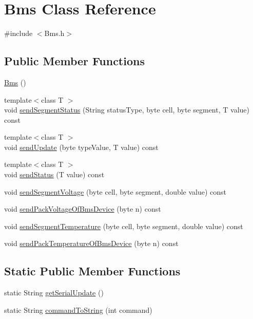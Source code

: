 \hypertarget{class_bms}{}\section{Bms Class Reference}
\label{class_bms}


{\ttfamily \#include $<$Bms.\+h$>$}

\subsection*{Public Member Functions}
\begin{DoxyCompactItemize}
\item 
\hyperlink{class_bms_a5d733fdf4429045471ec8fd56f9ae92e}{Bms} ()
\item 
{\footnotesize template$<$class T $>$ }\\void \hyperlink{class_bms_acb40c808d8fa45d5cf27dabe80c6e508}{send\+Segment\+Status} (String status\+Type, byte cell, byte segment, T value) const 
\item 
{\footnotesize template$<$class T $>$ }\\void \hyperlink{class_bms_acac85da825d6567cc0b1752c95a48e56}{send\+Update} (byte type\+Value, T value) const 
\item 
{\footnotesize template$<$class T $>$ }\\void \hyperlink{class_bms_ac2df5edf6db5cffe6c59967d36f4ab37}{send\+Status} (T value) const 
\item 
void \hyperlink{class_bms_accf66c78b3c4bda702f84ceaa0bc802a}{send\+Segment\+Voltage} (byte cell, byte segment, double value) const 
\item 
void \hyperlink{class_bms_ade1ae5d12af033485a2c7884f293e13b}{send\+Pack\+Voltage\+Of\+Bms\+Device} (byte n) const 
\item 
void \hyperlink{class_bms_a3aae77be4cf19a05b8bec3fa8d1344f8}{send\+Segment\+Temperature} (byte cell, byte segment, double value) const 
\item 
void \hyperlink{class_bms_a648ee6207c22128369a36391910514b0}{send\+Pack\+Temperature\+Of\+Bms\+Device} (byte n) const 
\end{DoxyCompactItemize}
\subsection*{Static Public Member Functions}
\begin{DoxyCompactItemize}
\item 
static String \hyperlink{class_bms_ab068da9c10b0bd7e865cba83fabaaaef}{get\+Serial\+Update} ()
\item 
static String \hyperlink{class_bms_aae88d468c07ca6c7cfdc58de46019b7e}{command\+To\+String} (int command)
\end{DoxyCompactItemize}


